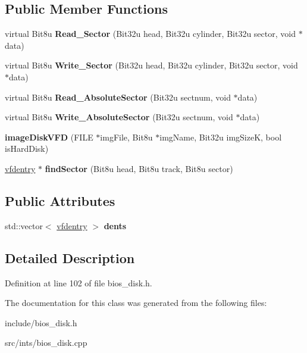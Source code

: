 \subsection*{Public Member Functions}
\begin{DoxyCompactItemize}
\item 
\hypertarget{classimageDiskVFD_a62b70cacae5003697385010ff0f40177}{virtual Bit8u {\bfseries Read\-\_\-\-Sector} (Bit32u head, Bit32u cylinder, Bit32u sector, void $\ast$data)}\label{classimageDiskVFD_a62b70cacae5003697385010ff0f40177}

\item 
\hypertarget{classimageDiskVFD_a72ab0618092979ba980cda19e326f8d7}{virtual Bit8u {\bfseries Write\-\_\-\-Sector} (Bit32u head, Bit32u cylinder, Bit32u sector, void $\ast$data)}\label{classimageDiskVFD_a72ab0618092979ba980cda19e326f8d7}

\item 
\hypertarget{classimageDiskVFD_a1bac8eb8cf34c0445b71d3966913f9cf}{virtual Bit8u {\bfseries Read\-\_\-\-Absolute\-Sector} (Bit32u sectnum, void $\ast$data)}\label{classimageDiskVFD_a1bac8eb8cf34c0445b71d3966913f9cf}

\item 
\hypertarget{classimageDiskVFD_a261457d9847ec43dbc0054e2f82e998c}{virtual Bit8u {\bfseries Write\-\_\-\-Absolute\-Sector} (Bit32u sectnum, void $\ast$data)}\label{classimageDiskVFD_a261457d9847ec43dbc0054e2f82e998c}

\item 
\hypertarget{classimageDiskVFD_a3d6b992a66cfce052569551fca9e137c}{{\bfseries image\-Disk\-V\-F\-D} (F\-I\-L\-E $\ast$img\-File, Bit8u $\ast$img\-Name, Bit32u img\-Size\-K, bool is\-Hard\-Disk)}\label{classimageDiskVFD_a3d6b992a66cfce052569551fca9e137c}

\item 
\hypertarget{classimageDiskVFD_a365454a401a7d07692d7b8ebb68e391b}{\hyperlink{structimageDiskVFD_1_1vfdentry}{vfdentry} $\ast$ {\bfseries find\-Sector} (Bit8u head, Bit8u track, Bit8u sector)}\label{classimageDiskVFD_a365454a401a7d07692d7b8ebb68e391b}

\end{DoxyCompactItemize}
\subsection*{Public Attributes}
\begin{DoxyCompactItemize}
\item 
\hypertarget{classimageDiskVFD_a9c11050c08b54c30cdb65f9c4250c856}{std\-::vector$<$ \hyperlink{structimageDiskVFD_1_1vfdentry}{vfdentry} $>$ {\bfseries dents}}\label{classimageDiskVFD_a9c11050c08b54c30cdb65f9c4250c856}

\end{DoxyCompactItemize}


\subsection{Detailed Description}


Definition at line 102 of file bios\-\_\-disk.\-h.



The documentation for this class was generated from the following files\-:\begin{DoxyCompactItemize}
\item 
include/bios\-\_\-disk.\-h\item 
src/ints/bios\-\_\-disk.\-cpp\end{DoxyCompactItemize}
